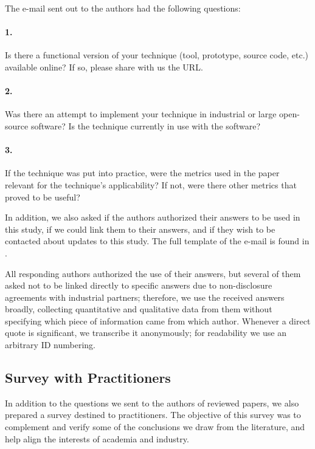 The e-mail sent out to the authors had the following questions:

\begin{tcolorbox}%
\small
\paragraph{1.}  Is there a functional version of your technique (tool, prototype, source code, etc.) available online? If so, please share with us the URL.

\paragraph{2.} Was there an attempt to implement your technique in industrial or large open-source software? Is the technique currently in use with the software?

\paragraph{3.} If the technique was put into practice, were the metrics used in the paper relevant for the technique’s applicability? If not, were there other metrics that proved to be useful?
\end{tcolorbox}

In addition, we also asked if the authors authorized their answers to be used in this study, if we could link them to their answers, and if they wish to be contacted about updates to this study.
The full template of the e-mail is found in .

All responding authors authorized the use of their answers, but several of them asked not to be linked directly to specific answers due to non-disclosure agreements with industrial partners; therefore, we use the received answers broadly, collecting quantitative and qualitative data from them without specifying which piece of information came from which author.
Whenever a direct quote is significant, we transcribe it anonymously; for readability we use an arbitrary ID numbering.

\subsection{Survey with Practitioners}
\label{subsec:prac_survey}

In addition to the questions we sent to the authors of reviewed papers, we also prepared a survey destined to practitioners.
The objective of this survey was to complement and verify some of the conclusions we draw from the literature, and help align the interests of academia and industry.

